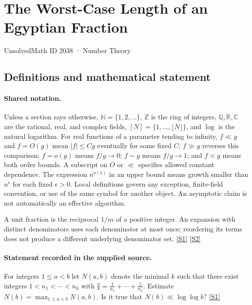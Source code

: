 \documentclass[11pt,a4paper]{article}
\newcommand{\N}{\mathbb{N}}
\newcommand{\Z}{\mathbb{Z}}
\newcommand{\Q}{\mathbb{Q}}
\newcommand{\R}{\mathbb{R}}
\newcommand{\C}{\mathbb{C}}
\newcommand{\sref}[2]{\hyperlink{source:#1:#2}{[S#2]}}
\begin{document}

\setcounter{section}{2037}

\section{The Worst-Case Length of an Egyptian Fraction}\label{2038}

{\small\sffamily UnsolvedMath ID 2038 · Number Theory}

\subsection{Definitions and mathematical statement}

\paragraph{Shared notation.}Unless a section says otherwise, $\N=\{1,2,\ldots\}$,
$\Z$ is the ring of integers, $\Q,\R,\C$ are the rational, real, and complex
fields, $[N]=\{1,\ldots,\lfloor N\rfloor\}$, and $\log$ is the natural
logarithm. For real functions of a parameter tending to infinity,
$f\ll g$ and $f=O(g)$ mean $|f|\leq Cg$ eventually for some fixed $C$;
$f\gg g$ reverses this comparison; $f=o(g)$ means $f/g\to0$;
$f\sim g$ means $f/g\to1$; and $f\asymp g$ means both order bounds.
A subscript on $O$ or $\ll$ specifies allowed constant dependence.
The expression $n^{o(1)}$ in an upper bound means growth smaller than
$n^\epsilon$ for each fixed $\epsilon>0$. Local definitions govern any
exception, finite-field convention, or use of the same symbol for another
object. An asymptotic claim is not automatically an effective algorithm.



A unit fraction is the reciprocal $1/m$ of a positive integer. An expansion with distinct denominators uses each denominator at most once; reordering its terms does not produce a different underlying denominator set. \sref{2038}{1} \sref{2038}{2}

\paragraph{Statement recorded in the supplied source.}
For integers $1\leq a<b$ let $N(a,b)$ denote the minimal $k$ such that there exist integers $1<n_1<\cdots<n_k$ with $ \frac{a}{b}=\frac{1}{n_1}+\cdots+\frac{1}{n_k}. $ Estimate $N(b)=\max_{1\leq a<b}N(a,b)$. Is it true that $N(b) \ll \log\log b$? \sref{2038}{1}
\end{document}
